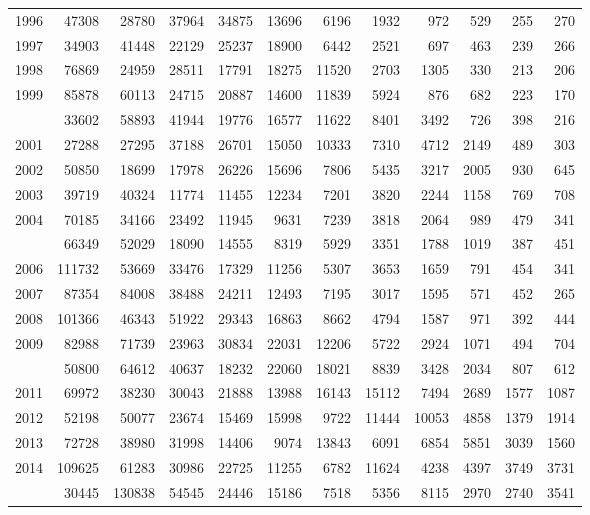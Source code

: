 \documentclass[
]{article}
\begin{document}
\begin{longtable}[t]{lrrrrrrrrrrr}
1996 & 47308 & 28780 & 37964 & 34875 & 13696 & 6196 & 1932 & 972 & 529 & 255 & 270\\
1997 & 34903 & 41448 & 22129 & 25237 & 18900 & 6442 & 2521 & 697 & 463 & 239 & 266\\
1998 & 76869 & 24959 & 28511 & 17791 & 18275 & 11520 & 2703 & 1305 & 330 & 213 & 206\\
1999 & 85878 & 60113 & 24715 & 20887 & 14600 & 11839 & 5924 & 876 & 682 & 223 & 170\\
\addlinespace
2000 & 33602 & 58893 & 41944 & 19776 & 16577 & 11622 & 8401 & 3492 & 726 & 398 & 216\\
2001 & 27288 & 27295 & 37188 & 26701 & 15050 & 10333 & 7310 & 4712 & 2149 & 489 & 303\\
2002 & 50850 & 18699 & 17978 & 26226 & 15696 & 7806 & 5435 & 3217 & 2005 & 930 & 645\\
2003 & 39719 & 40324 & 11774 & 11455 & 12234 & 7201 & 3820 & 2244 & 1158 & 769 & 708\\
2004 & 70185 & 34166 & 23492 & 11945 & 9631 & 7239 & 3818 & 2064 & 989 & 479 & 341\\
\addlinespace
2005 & 66349 & 52029 & 18090 & 14555 & 8319 & 5929 & 3351 & 1788 & 1019 & 387 & 451\\
2006 & 111732 & 53669 & 33476 & 17329 & 11256 & 5307 & 3653 & 1659 & 791 & 454 & 341\\
2007 & 87354 & 84008 & 38488 & 24211 & 12493 & 7195 & 3017 & 1595 & 571 & 452 & 265\\
2008 & 101366 & 46343 & 51922 & 29343 & 16863 & 8662 & 4794 & 1587 & 971 & 392 & 444\\
2009 & 82988 & 71739 & 23963 & 30834 & 22031 & 12206 & 5722 & 2924 & 1071 & 494 & 704\\
\addlinespace
2010 & 50800 & 64612 & 40637 & 18232 & 22060 & 18021 & 8839 & 3428 & 2034 & 807 & 612\\
2011 & 69972 & 38230 & 30043 & 21888 & 13988 & 16143 & 15112 & 7494 & 2689 & 1577 & 1087\\
2012 & 52198 & 50077 & 23674 & 15469 & 15998 & 9722 & 11444 & 10053 & 4858 & 1379 & 1914\\
2013 & 72728 & 38980 & 31998 & 14406 & 9074 & 13843 & 6091 & 6854 & 5851 & 3039 & 1560\\
2014 & 109625 & 61283 & 30986 & 22725 & 11255 & 6782 & 11624 & 4238 & 4397 & 3749 & 3731\\
\addlinespace
2015 & 30445 & 130838 & 54545 & 24446 & 15186 & 7518 & 5356 & 8115 & 2970 & 2740 & 3541\\

\end{longtable}
\end{document}
